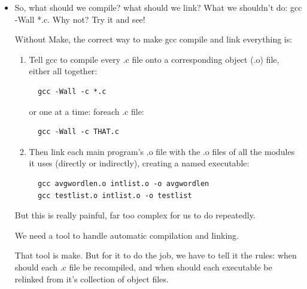 \documentclass[handout]{beamer}
\begin{document}
\begin{frame}[fragile]
    \begin{itemize}
    \item
    So, what should we compile?  what should we link?
    \pitem
    What we shouldn't do: \alert{gcc -Wall *.c}.  Why not?  Try it and see!

    \pitem
    Without Make, the correct way to make gcc compile and link everything is:

    \begin{enumerate}
    \pause
    \item
    Tell gcc to compile every .c file onto a corresponding object (.o) file, either all together:
\begin{verbatim}
  gcc -Wall -c *.c
\end{verbatim}
    or one at a time: foreach .c file:
\begin{verbatim}
  gcc -Wall -c THAT.c
\end{verbatim}

    \pause
    \item
    Then link each main program's .o file with the .o files of all the modules it uses (directly
    or indirectly), creating a named executable:

\begin{verbatim}
  gcc avgwordlen.o intlist.o -o avgwordlen
  gcc testlist.o intlist.o -o testlist
\end{verbatim}

    \end{enumerate}

    \pitem
    But this is really painful, far too complex for us to do repeatedly.

    \pitem
    We \alert{need a tool to handle automatic compilation and linking}.

    \pitem
    That tool is \alert{make}.
    \pause
    But for it to do the job, we have to \alert{tell it the rules}:
    when should each .c file be recompiled, and when should each executable be relinked from it's
    collection of object files.

    \end{itemize}

\end{frame}
\end{document}
